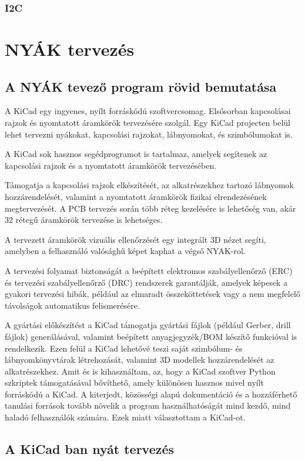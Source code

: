 \documentclass[a4paper,12pt,oneside]{book}
\begin{document}
\subsection{I2C}
\chapter{NYÁK tervezés}
\section{A NYÁK tevező program rövid bemutatása}
A KiCad egy ingyenes, nyílt forráskódú szoftvercsomag. Elsősorban kapcsolásai rajzok és nyomtatott áramkörök tervezésére szolgál. Egy KiCad projecten belül lehet tervezni nyákokat, kapcsolási rajzokat, lábnyomokat, és szimbólumokat is.

A KiCad sok hasznos segédprogramot is tartalmaz, amelyek segítenek az kapcsolási rajzok és a nyomtatott áramkörök tervezésében. 

Támogatja a kapcsolási rajzok elkészítését, az alkatrészekhez tartozó lábnyomok hozzárendelését, valamint a nyomtatott áramkörök fizikai elrendezésének megtervezését. A PCB tervezés során több réteg kezelésére is lehetőség van, akár 32 rétegű áramkörök tervezése is lehetséges. 

A tervezett áramkörök vizuális ellenőrzését egy integrált 3D nézet segíti, amelyben a felhasználó valósághű képet kaphat a végső NYAK-rol. 

A tervezési folyamat biztonságát a beépített elektromos szabályellenőrző (ERC) és tervezési szabályellenőrző (DRC) rendszerek garantálják, amelyek képesek a gyakori tervezési hibák, például az elmaradt összeköttetések vagy a nem megfelelő távolságok automatikus felismerésére. 

A gyártási előkészítést a KiCad támogatja gyártási fájlok (például Gerber, drill fájlok) generálásával, valamint beépített anyagjegyzék/BOM készítő funkcióval is rendelkezik. Ezen felül a KiCad lehetővé teszi saját szimbólum- és lábnyomkönyvtárak létrehozását, valamint 3D modellek hozzárendelését az alkatrészekhez. 
Amit és is kihasználtam, az, hogy a KiCad szoftver Python szkriptek támogatásával bővíthető, amely különösen hasznos mivel nyílt forráskódú a KiCad. A kiterjedt, közösségi alapú dokumentáció és a hozzáférhető tanulási források tovább növelik a program használhatóságát mind kezdő, mind haladó felhasználók számára. Ezek miatt választottam a KiCad-ot.
\section{A KiCad ban nyát tervezés} 
\end{document}
